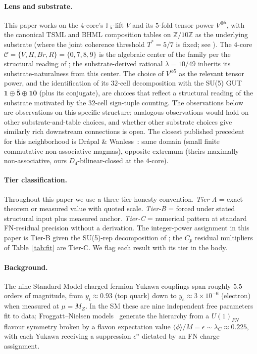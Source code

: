 \documentclass[11pt,reqno]{amsart}
\theoremstyle{plain}
\theoremstyle{definition}
\theoremstyle{remark}
\newcommand{\Z}{\mathbb{Z}}
\newcommand{\F}{\mathbb{F}}
\newcommand{\Cfour}{\mathcal{C}}  %
\newcommand{\rep}[1]{\mathbf{#1}}
\newcommand{\barrep}[1]{\bar{\mathbf{#1}}}
\begin{document}
\paragraph{Lens and substrate.} This paper works on the
$4$-core's $\F_5$-lift $V$ and its $5$-fold tensor power
$V^{\otimes 5}$, with the canonical TSML and BHML composition
tables on $\Z/10\Z$ as the underlying substrate (where the
joint coherence threshold $T^* = 5/7$ is fixed; see
\cite{SandersGish2026FourCore}). The $4$-core
$\Cfour = \{V, H, Br, R\} = \{0, 7, 8, 9\}$ is the algebraic
center of the family per the structural reading of
\cite{FamilyStructure2026}; the substrate-derived rational
$\lambda = 10/49$ inherits its substrate-naturalness from this
center. The choice of $V^{\otimes 5}$ as the relevant tensor
power, and the identification of its $32$-cell decomposition
with the SU(5) GUT $\rep{1} \oplus \barrep{5} \oplus \rep{10}$
(plus its conjugate), are choices that reflect a structural
reading of the substrate motivated by the $32$-cell sign-tuple
counting. The observations below are observations on this
specific structure; analogous observations would hold on other
substrate-and-table choices, and whether other substrate
choices give similarly rich downstream connections is open.
The closest published precedent for this neighborhood is
Dr\'apal \& Wanless~\cite{DrapalWanless2021}: same domain
(small finite commutative non-associative magmas), opposite
extremum (theirs maximally non-associative, ours
$D_4$-bilinear-closed at the $4$-core).

\paragraph{Tier classification.} Throughout this paper we use
a three-tier honesty convention. \emph{Tier-A} = exact theorem
or measured value with quoted scale. \emph{Tier-B} = forced
under stated structural input plus measured anchor.
\emph{Tier-C} = numerical pattern at standard FN-residual
precision without a derivation. The integer-power assignment
in this paper is Tier-B given the SU(5)-rep decomposition of
\cite{SandersGish2026DiscreteDirac}; the $C_p$ residual
multipliers of Table~\ref{tab:fit} are Tier-C. We flag
each result with its tier in the body.

\paragraph{Background.} The nine Standard Model charged-fermion
Yukawa couplings span roughly $5.5$ orders of magnitude, from
$y_t \approx 0.93$ (top quark) down to $y_e \approx 3 \times
10^{-6}$ (electron) when measured at $\mu = M_Z$. In the SM
these are nine independent free parameters fit to data;
Froggatt--Nielsen models~\cite{FroggattNielsen1979} generate the
hierarchy from a $U(1)_{FN}$ flavour symmetry broken by a flavon
expectation value $\langle\phi\rangle/M = \epsilon \sim
\lambda_{C} \approx 0.225$, with each Yukawa receiving a
suppression $\epsilon^{n}$ dictated by an FN charge assignment.
\end{document}
